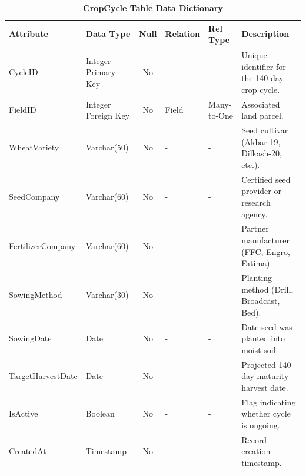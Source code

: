 \documentclass{FastFyp}
\begin{document}
\begin{table}[!htbp]
\footnotesize
\centering
\caption{\label{tab:cropcycle_table} \textbf{CropCycle Table Data Dictionary}}
\begin{tabular}{|l|l|c|l|l|p{4.5cm}|}
\hline
\textbf{Attribute} & \textbf{Data Type} & \textbf{Null} & \textbf{Relation} & \textbf{Rel Type} & \textbf{Description} \\ \hline
CycleID & Integer Primary Key & No & - & - & Unique identifier for the 140-day crop cycle. \\ \hline
FieldID & Integer Foreign Key & No & Field & Many-to-One & Associated land parcel. \\ \hline
WheatVariety & Varchar(50) & No & - & - & Seed cultivar (Akbar-19, Dilkash-20, etc.). \\ \hline
SeedCompany & Varchar(60) & No & - & - & Certified seed provider or research agency. \\ \hline
FertilizerCompany & Varchar(60) & No & - & - & Partner manufacturer (FFC, Engro, Fatima). \\ \hline
SowingMethod & Varchar(30) & No & - & - & Planting method (Drill, Broadcast, Bed). \\ \hline
SowingDate & Date & No & - & - & Date seed was planted into moist soil. \\ \hline
TargetHarvestDate & Date & No & - & - & Projected 140-day maturity harvest date. \\ \hline
IsActive & Boolean & No & - & - & Flag indicating whether cycle is ongoing. \\ \hline
CreatedAt & Timestamp & No & - & - & Record creation timestamp. \\ \hline
\end{tabular}
\end{table}
\end{document}
